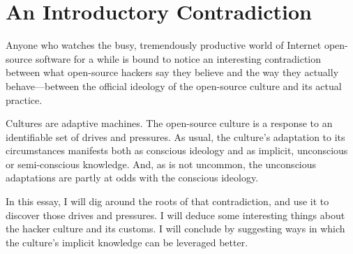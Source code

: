\section{An Introductory Contradiction}

Anyone who watches the busy, tremendously productive world of Internet
open-source software for a while is bound to notice an interesting contradiction
between what open-source hackers say they believe and the way they actually
behave—between the official ideology of the open-source culture and its actual
practice.

Cultures are adaptive machines.  The open-source culture is a response to an
identifiable set of drives and pressures.  As usual, the culture's adaptation to
its circumstances manifests both as conscious ideology and as implicit,
unconscious or semi-conscious knowledge.  And, as is not uncommon, the
unconscious adaptations are partly at odds with the conscious ideology.

In this essay, I will dig around the roots of that contradiction, and use it to
discover those drives and pressures.  I will deduce some interesting things
about the hacker culture and its customs.  I will conclude by suggesting ways in
which the culture's implicit knowledge can be leveraged better.
